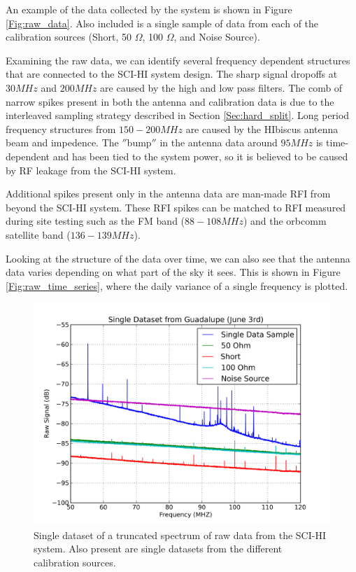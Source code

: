 An example of the data collected by the system is shown in Figure \ref{Fig:raw_data}. Also included is a single sample of data from each of the calibration sources (Short, 50 $\Omega$, 100 $\Omega$, and Noise Source). 

Examining the raw data, we can identify several frequency dependent structures that are connected to the SCI-HI system design. The sharp signal dropoffs at $30 MHz$ and $200 MHz$ are caused by the high and low pass filters. The comb of narrow spikes present in both the antenna and calibration data is due to the interleaved sampling strategy described in Section \ref{Sec:hard_split}. Long period frequency structures from $150-200 MHz$ are caused by the HIbiscus antenna beam and impedence. The $''$bump$''$ in the antenna data around $95 MHz$ is time-dependent and has been tied to the system power, so it is believed to be caused by RF leakage from the SCI-HI system. 

Additional spikes present only in the antenna data are man-made RFI from beyond the SCI-HI system. These RFI spikes can be matched to RFI measured during site testing such as the FM band ($88-108 MHz$) and the orbcomm satellite band ($136-139 MHz$). 

Looking at the structure of the data over time, we can also see that the antenna data varies depending on what part of the sky it sees. This is shown in Figure \ref{Fig:raw_time_series}, where the daily variance of a single frequency is plotted.  


\begin{figure}[htb]
\begin{center}
\includegraphics[width=0.9\linewidth]{Data_analysis/figures/single_raw_trunc_guad_june03.png}
\caption{Single dataset of a truncated spectrum of raw data from the SCI-HI system. Also present are single datasets from the different calibration sources.}
\label{Fig:raw_data_trunc}
\end{center}
\end{figure}


